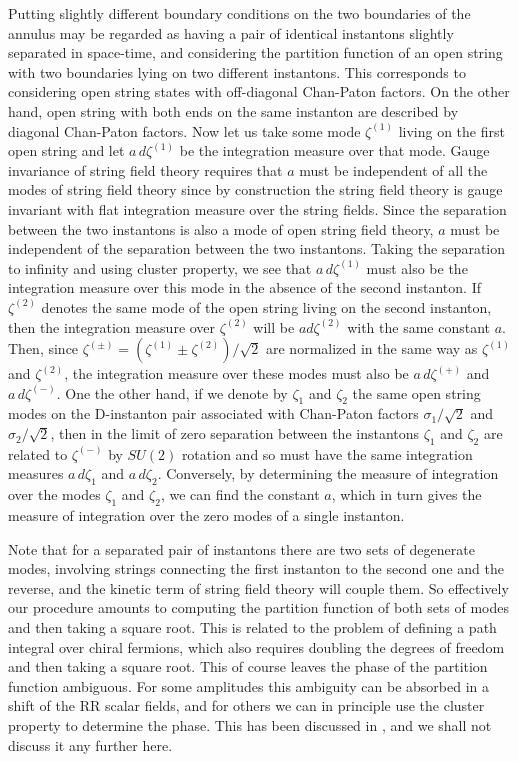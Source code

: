 \documentclass[12pt,a4paper]{article}
\begin{document}
Putting slightly different boundary conditions on the two boundaries of the annulus may
be regarded as having a pair of identical instantons slightly separated in space-time,
and considering the partition function of an open string with two boundaries lying
on two different instantons. This corresponds to considering open string states with
off-diagonal Chan-Paton factors. On the other hand, open string with both ends on the same
instanton are described by diagonal Chan-Paton factors. Now let us take some mode
$\zeta^{(1)}$ living on the first open string and let
$a\,d\zeta^{(1)}$ be the integration measure
over that mode. Gauge invariance of string field theory requires that $a$ must be
independent of all the modes of string field theory since by construction the string field
theory is gauge invariant with flat integration measure over the string fields. Since the separation between the
two instantons is also a mode of open string field theory, $a$ must be independent of the
separation between the two instantons. Taking the separation to infinity and using cluster
property, we see that
$a\,d\zeta^{(1)}$ must also be the integration measure over this mode in the absence
of the second instanton. If $\zeta^{(2)}$ denotes the same mode of the open string living
on the second instanton, then the integration measure over
$\zeta^{(2)}$ will be $ad\zeta^{(2)}$ with the same constant $a$.
Then, since $\zeta^{(\pm)} = (\zeta^{(1)}\pm
\zeta^{(2)})/\sqrt 2$ are normalized in the same way as $\zeta^{(1)}$ and $\zeta^{(2)}$, the
integration measure over these modes must also be $a\,d\zeta^{(+)}$ and $a\,d\zeta^{(-)}$.
One the other hand, if we denote by $\zeta_1$ and $\zeta_2$ the same open string modes
on the D-instanton pair associated with Chan-Paton factors $\sigma_1/\sqrt 2$ and
$\sigma_2/\sqrt 2$, then in the limit of zero separation between the instantons
$\zeta_1$ and $\zeta_2$ are related to $\zeta^{(-)}$ by $SU(2)$
rotation and so must have the same integration measures $a\,d\zeta_1$ and $a\,d\zeta_2$.
Conversely, by determining the measure of integration over the modes
$\zeta_1$ and $\zeta_2$,
we can find the constant $a$, which in turn gives the measure of integration over the zero
modes of a single instanton.

Note
that for a separated pair of instantons there are two sets
of degenerate modes, involving strings connecting the first instanton to the second one and
the reverse, and the kinetic term of string field theory
will couple them. So effectively our procedure amounts
to computing the partition function of both sets of modes and then taking a square root.
This is related to the problem of defining a path integral over
chiral fermions, which
also requires doubling the degrees of freedom and then taking a
square root. This of course leaves the
phase of the partition function ambiguous. For some amplitudes this ambiguity can be
absorbed in a shift of the RR scalar fields, and for others we can in principle use the cluster
property to determine the phase. This has been discussed in
\cite{Alexandrov:2021shf}, and we shall not discuss it any further here.
\end{document}
